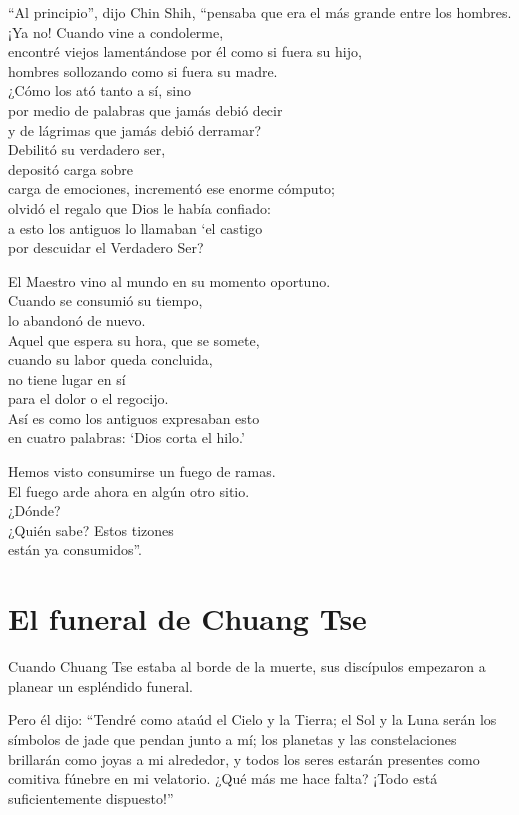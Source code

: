 \documentclass[hidelinks]{memoir}
\begin{document}
	``Al principio'', dijo Chin Shih, ``pensaba que era el más grande entre
	los hombres.\\
	¡Ya no! Cuando vine a condolerme,\\
	encontré viejos lamentándose por él como si fuera su hijo,\\
	hombres sollozando como si fuera su madre.\\
	¿Cómo los ató tanto a sí, sino\\
	por medio de palabras que jamás debió decir\\
	y de lágrimas que jamás debió derramar?\\
	Debilitó su verdadero ser,\\
	depositó carga sobre\\
	carga de emociones, incrementó ese enorme cómputo;\\
	olvidó el regalo que Dios le había confiado:\\
	a esto los antiguos lo llamaban `el castigo\\
	por descuidar el Verdadero Ser?
	
	El Maestro vino al mundo en su momento oportuno.\\
	Cuando se consumió su tiempo,\\
	lo abandonó de nuevo.\\
	Aquel que espera su hora, que se somete,\\
	cuando su labor queda concluida,\\
	no tiene lugar en sí\\
	para el dolor o el regocijo.\\
	Así es como los antiguos expresaban esto\\
	en cuatro palabras: `Dios corta el hilo.'
	
	Hemos visto consumirse un fuego de ramas.\\
	El fuego arde ahora en algún otro sitio.\\
	¿Dónde?\\
	¿Quién sabe? Estos tizones\\
	están ya consumidos''.
	
	\chapter*{El funeral de Chuang Tse}
	
	Cuando Chuang Tse estaba al borde de la muerte, sus discípulos empezaron
	a planear un espléndido funeral.
	
	Pero él dijo: ``Tendré como ataúd el Cielo y la Tierra; el Sol y la Luna
	serán los símbolos de jade que pendan junto a mí; los planetas y las
	constelaciones brillarán como joyas a mi alrededor, y todos los seres
	estarán presentes como comitiva fúnebre en mi velatorio. ¿Qué más me
	hace falta? ¡Todo está suficientemente dispuesto!''
	
\end{document}
